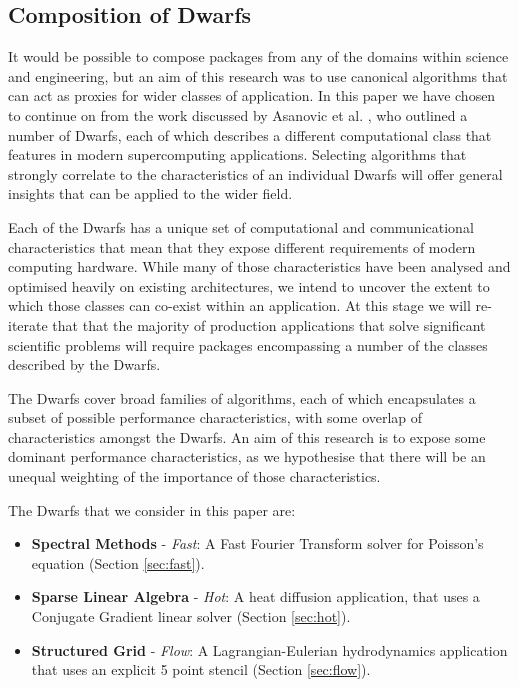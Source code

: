 \documentclass[runningheads,a4paper]{llncs}
\begin{document}
\subsection{Composition of Dwarfs}

It would be possible to compose packages from any of the domains within science and engineering, but an aim of this research was to use canonical algorithms that can act as proxies for wider classes of application. In this paper we have chosen to continue on from the work discussed by Asanovic et al. \cite{Asanovic2006}, who outlined a number of Dwarfs, each of which describes a different computational class that features in modern supercomputing applications. Selecting algorithms that strongly correlate to the characteristics of an individual Dwarfs will offer general insights that can be applied to the wider field.

Each of the Dwarfs has a unique set of computational and communicational characteristics that mean that they expose different requirements of modern computing hardware. While many of those characteristics have been analysed and optimised heavily on existing architectures, we intend to uncover the extent to which those classes can co-exist within an application. At this stage we will re-iterate that that the majority of production applications that solve significant scientific problems will require packages encompassing a number of the classes described by the Dwarfs.

The Dwarfs cover broad families of algorithms, each of which encapsulates a subset of possible performance characteristics, with some overlap of characteristics amongst the Dwarfs. An aim of this research is to expose some dominant performance characteristics, as we hypothesise that there will be an unequal weighting of the importance of those characteristics. 

The Dwarfs that we consider in this paper are:

\begin{itemize}
  \item \textbf{Spectral Methods} - \textit{Fast}: A Fast Fourier Transform solver for Poisson's equation (Section \ref{sec:fast}).
  \item \textbf{Sparse Linear Algebra} - \textit{Hot}: A heat diffusion application, that uses a Conjugate Gradient linear solver (Section \ref{sec:hot}).
  \item \textbf{Structured Grid} - \textit{Flow}: A Lagrangian-Eulerian hydrodynamics application that uses an explicit 5 point stencil (Section \ref{sec:flow}).
\end{itemize}
\end{document}
